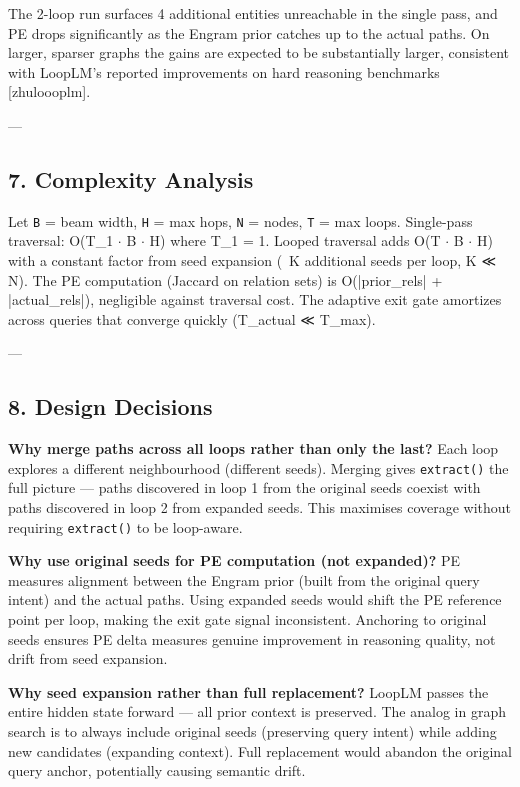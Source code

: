 The 2-loop run surfaces 4 additional entities unreachable in the single pass, and PE drops signi\-ficantly as the Engram prior catches up to the actual paths. On larger, sparser graphs the gains are expected to be subst\-antially larger, consistent with LoopLM's reported impro\-vements on hard reasoning benchmarks [zhu\-loooplm].

---

\subsection{7. Complexity Analysis}

Let \texttt{B} = beam width, \texttt{H} = max hops, \texttt{N} = nodes, \texttt{T} = max loops. Single-pass traversal: O(T\_1 $\cdot$ B $\cdot$ H) where T\_1 = 1. Looped traversal adds O(T $\cdot$ B $\cdot$ H) with a constant factor from seed expansion (~K additional seeds per loop, K ≪ N). The PE computation (Jaccard on relation sets) is O(|prior\_rels| + |actual\_rels|), negligible against traversal cost. The adaptive exit gate amortizes across queries that converge quickly (T\_actual ≪ T\_max).

---

\subsection{8. Design Decisions}

\textbf{Why merge paths across all loops rather than only the last?}
Each loop explores a different neigh\-bourhood (different seeds). Merging gives \texttt{extract()} the full picture — paths discovered in loop 1 from the original seeds coexist with paths discovered in loop 2 from expanded seeds. This maximises coverage without requiring \texttt{extract()} to be loop-aware.

\textbf{Why use original seeds for PE computation (not expanded)?}
PE measures alignment between the Engram prior (built from the original query intent) and the actual paths. Using expanded seeds would shift the PE reference point per loop, making the exit gate signal incon\-sistent. Anchoring to original seeds ensures PE delta measures genuine improvement in reasoning quality, not drift from seed expansion.

\textbf{Why seed expansion rather than full replacement?}
LoopLM passes the entire hidden state forward — all prior context is preserved. The analog in graph search is to always include original seeds (preserving query intent) while adding new candidates (expanding context). Full replacement would abandon the original query anchor, potentially causing semantic drift.

